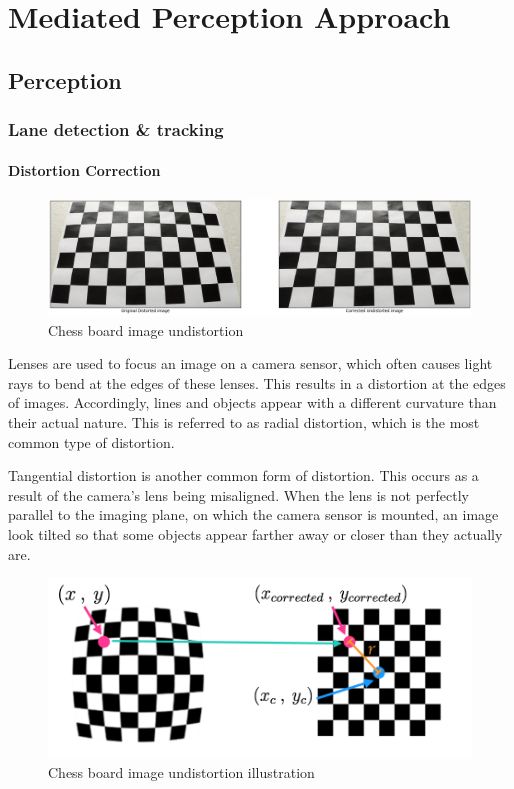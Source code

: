

\chapter{Mediated Perception Approach}
	\section{Perception}
		\subsection{Lane detection \& tracking}
		\subsubsection{Distortion Correction}
    		\begin{figure}[htbp]
            \centerline{\includegraphics[width=\linewidth]{Figures/undist_chess.png}}
            \caption{Chess board image undistortion}
            \end{figure}
    		Lenses are used to focus an image on a camera sensor, which often causes light rays to bend at the edges of these lenses. This results in a distortion at the edges of images. Accordingly, lines and objects appear with a different curvature than their actual nature. This is referred to as radial distortion, which is the most common type of distortion.
    		
    		Tangential distortion is another common form of distortion. This occurs as a result of the camera’s lens being misaligned. When the lens is not perfectly parallel to the imaging plane, on which the camera sensor is mounted, an image look tilted so that some objects appear farther away or closer than they actually are.
    		
            \begin{figure}[H]
            \centerline{\includegraphics[width=\linewidth]{Figures/undistort.png}}
            \caption{Chess board image undistortion illustration}
            \end{figure}
            
